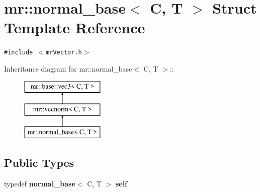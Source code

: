 \section{mr::normal\_\-base$<$ C, T $>$ Struct Template Reference}
\label{structmr_1_1normal__base}
{\tt \#include $<$mr\-Vector.h$>$}

Inheritance diagram for mr::normal\_\-base$<$ C, T $>$::\begin{figure}[H]
\begin{center}
\leavevmode
\includegraphics[height=3cm]{structmr_1_1normal__base}
\end{center}
\end{figure}
\subsection*{Public Types}
\begin{CompactItemize}
\item 
typedef {\bf normal\_\-base}$<$ C, T $>$ {\bf self}
\end{CompactItemize}
